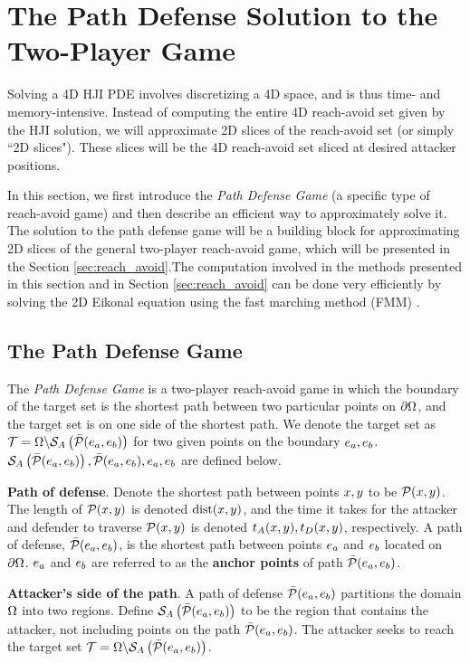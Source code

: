 \section{The Path Defense Solution to the Two-Player Game}
\label{sec:path_defense}
Solving a 4D HJI PDE involves discretizing a 4D space, and is thus time- and memory-intensive. Instead of computing the entire 4D reach-avoid set given by the HJI solution, we will approximate 2D slices of the reach-avoid set (or simply ``2D slices"). These slices will be the 4D reach-avoid set sliced at desired attacker positions.  

In this section, we first introduce the \textit{Path Defense Game} (a specific type of reach-avoid game) and then describe an efficient way to approximately solve it. The solution to the path defense game will be a building block for approximating 2D slices of the general two-player reach-avoid game, which will be presented in the Section \ref{sec:reach_avoid}.The computation involved in the methods presented in this section and in Section \ref{sec:reach_avoid} can be done very efficiently by solving the 2D Eikonal equation using the fast marching method (FMM) \cite{Sethian1996}.

\subsection{The Path Defense Game}
The \textit{Path Defense Game} is a two-player reach-avoid game in which the boundary of the target set is the shortest path between two particular points on $\partial\Omega$, and the target set is on one side of the shortest path. We denote the target set as $\mathcal{T}=\Omega\backslash\mathcal{S}_A\left(\bar{\mathcal{P}}(e_a,e_b)\right)$ for two given points on the boundary $e_a,e_b$. $\mathcal{S}_A\left(\bar{\mathcal{P}}(e_a,e_b)\right),\bar{\mathcal{P}}(e_a,e_b),e_a,e_b$ are defined below. 

\begin{defn} %
\textbf{Path of defense}. Denote the shortest path between points $x,y$ to be $\mathcal{P}(x,y)$. The length of $\mathcal{P}(x,y)$ is denoted $\text{dist}(x,y)$, and the time it takes for the attacker and defender to traverse $\mathcal{P}(x,y)$ is denoted $t_A(x, y),t_D(x,y)$, respectively. A path of defense, $\bar{\mathcal{P}}(e_a,e_b)$, is the shortest path between points $e_a$ and $e_b$ located on $\partial\Omega$. $e_a$ and $e_b$ are referred to as the \textbf{anchor points} of path $\bar{\mathcal{P}}(e_a,e_b)$. 
\end{defn}

\begin{defn} %
\textbf{Attacker's side of the path}. A path of defense $\bar{\mathcal{P}}(e_a,e_b)$ partitions the domain $\Omega$ into two regions. Define $\mathcal{S}_A\left(\bar{\mathcal{P}}(e_a,e_b)\right)$ to be the region that contains the attacker, not including points on the path $\bar{\mathcal{P}}(e_a,e_b)$. The attacker seeks to reach the target set $\mathcal{T}=\Omega\backslash\mathcal{S}_A\left(\bar{\mathcal{P}}(e_a,e_b)\right)$.
\end{defn}

